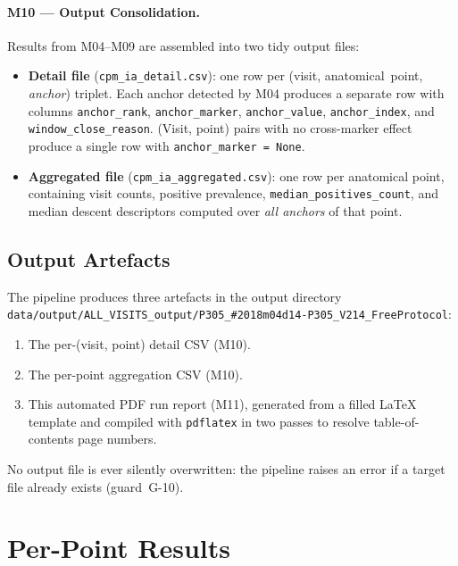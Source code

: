 \documentclass[a4paper,11pt]{article}
\begin{document}
\paragraph{M10 --- Output Consolidation.}
Results from M04--M09 are assembled into two tidy output files:
\begin{itemize}
  \item \textbf{Detail file} (\texttt{cpm\_ia\_detail.csv}): one row per
        (visit, anatomical~point, \emph{anchor}) triplet. Each anchor detected by M04
        produces a separate row with columns \texttt{anchor\_rank},
        \texttt{anchor\_marker}, \texttt{anchor\_value}, \texttt{anchor\_index},
        and \texttt{window\_close\_reason}.
        (Visit, point) pairs with no cross-marker effect produce a single row with
        \texttt{anchor\_marker = None}.
  \item \textbf{Aggregated file} (\texttt{cpm\_ia\_aggregated.csv}): one row per
        anatomical point, containing visit counts, positive prevalence,
        \texttt{median\_positives\_count}, and median descent descriptors computed over
        \emph{all anchors} of that point.
\end{itemize}

\subsection{Output Artefacts}

The pipeline produces three artefacts in the output directory \texttt{data/output/ALL\_VISITS\_output/P305\_\#2018m04d14-P305\_V214\_FreeProtocol}:
\begin{enumerate}
  \item The per-(visit, point) detail CSV (M10).
  \item The per-point aggregation CSV (M10).
  \item This automated PDF run report (M11), generated from a filled \LaTeX{} template
        and compiled with \texttt{pdflatex} in two passes to resolve table-of-contents
        page numbers.
\end{enumerate}
No output file is ever silently overwritten: the pipeline raises an error if a target
file already exists (guard~G-10).

\section{Per-Point Results}
\end{document}
